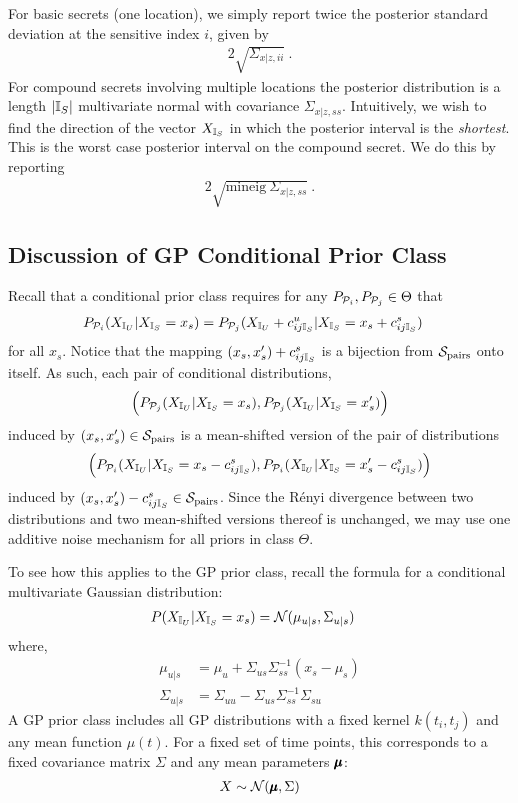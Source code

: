 For basic secrets (one location), we simply report twice the posterior standard deviation at the sensitive index $i$, given by 
\begin{align*}
2 \sqrt{ \Sigma_{{x|z, ii}} } \ .
\end{align*}  
For compound secrets involving multiple locations the posterior distribution is a length $|{\mathbb{I}_S}|$ multivariate normal with covariance $\Sigma_{x|z, ss}$. Intuitively, we wish to find the direction of the vector ${X_{\mathbb{I}_S}}$ in which the posterior interval is the \emph{shortest}. This is the worst case posterior interval on the compound secret. We do this by reporting 
\begin{align*}
	2 \sqrt{\text{mineig}\  \Sigma_{{x|z, ss}}} \ .
\end{align*}

\subsection{Discussion of GP Conditional Prior Class}
\label{apx: GP prior class}

Recall that a conditional prior class requires for any $P_{\mathcal{P}_i}, P_{\mathcal{P}_j} \in \Theta$ that 
\begin{align*}
	P_{\mathcal{P}_i}({X_{\mathbb{I}_U}} | {X_{\mathbb{I}_S}} = x_s)
	&= P_{\mathcal{P}_j}({X_{\mathbb{I}_U}} + c_{ij{\mathbb{I}_S}}^u | {X_{\mathbb{I}_S}} = x_s + c_{ij{\mathbb{I}_S}}^s)
\end{align*}
for all $x_s$. Notice that the mapping $(x_s, x_s') + c_{ij{\mathbb{I}_S}}^s$ is a bijection from $\mathcal{S}_{\text{pairs}}$ onto itself. As such, each pair of conditional distributions, 
\begin{align*}
	\Big(P_{\mathcal{P}_j}({X_{\mathbb{I}_U}} | {X_{\mathbb{I}_S}} = x_s), P_{\mathcal{P}_j}({X_{\mathbb{I}_U}} | {X_{\mathbb{I}_S}} = x_s')\Big)
\end{align*}
induced by $(x_s, x_s') \in \mathcal{S}_{\text{pairs}}$ is a mean-shifted version of the pair of distributions 
\begin{align*}
	\Big(P_{\mathcal{P}_i}({X_{\mathbb{I}_U}} | {X_{\mathbb{I}_S}} = x_s - c_{ij{\mathbb{I}_S}}^s), P_{\mathcal{P}_i}({X_{\mathbb{I}_U}} | {X_{\mathbb{I}_S}} = x_s' - c_{ij{\mathbb{I}_S}}^s)\Big)
\end{align*}
induced by $(x_s , x_s' ) - c_{ij{\mathbb{I}_S}}^s \in \mathcal{S}_{\text{pairs}}$. Since the R\'enyi divergence between two distributions and two mean-shifted versions thereof is unchanged, we may use one additive noise mechanism for all priors in class $\Theta$.  

To see how this applies to the GP prior class, recall the formula for a conditional multivariate Gaussian distribution: 
\begin{align*}
	P({X_{\mathbb{I}_U}} | {X_{\mathbb{I}_S}} = x_s)
	&= \mathcal{N}(\mu_{u|s} , \Sigma_{u|s})
\end{align*}
where, 
\begin{align*}
		\mu_{u|s} &= \mu_u + \Sigma_{us} \Sigma_{ss}^{-1} (x_s - \mu_s) \\
		\Sigma_{u|s} &= \Sigma_{uu} - \Sigma_{us}\Sigma_{ss}^{-1} \Sigma_{su}
\end{align*}
A GP prior class includes all GP distributions with a fixed kernel $k(t_i, t_j)$ and any mean function $\mu(t)$. For a fixed set of time points, this corresponds to a fixed covariance matrix $\Sigma$ and any mean parameters $\pmb{\mu}$: 
\begin{align*}
	X \sim \mathcal{N}(\pmb{\mu}, \Sigma)
\end{align*}

